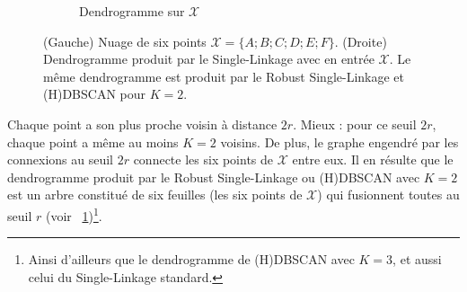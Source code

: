 \begin{figure}[htbp]
\begin{subfigure}[b]{0.48\textwidth}
        \caption{Dendrogramme sur $\mathcal X$}
        \label{fig:dendrogramme}
    \end{subfigure}
    
    \caption{(Gauche) Nuage de six points $\mathcal X = \bigl\{A ; B ; C ; D ; E ; F\bigr\}$. (Droite) Dendrogramme produit par le Single-Linkage avec en entrée $\mathcal X$. Le même dendrogramme est produit par le Robust Single-Linkage et (H)DBSCAN pour $K=2$.}
    \label{fig:clustering}
\end{figure}

Chaque point a son plus proche voisin à distance $2r$. Mieux : pour ce seuil $2r$, chaque point a même au moins $K=2$ voisins. De plus, le graphe engendré par les connexions au seuil $2r$ connecte les six points de $\mathcal X$ entre eux. Il en résulte que le dendrogramme produit par le Robust Single-Linkage ou (H)DBSCAN avec $K=2$ est un arbre constitué de six feuilles (les six points de $\mathcal X$) qui fusionnent toutes au seuil $r$ (voir \Fig~\ref{fig:dendrogramme})\footnote{Ainsi d'ailleurs que le dendrogramme de (H)DBSCAN avec $K=3$, et aussi celui du Single-Linkage standard.}.

